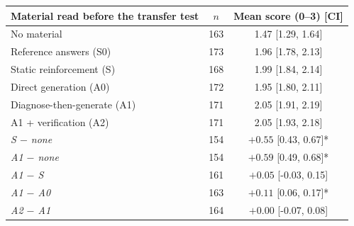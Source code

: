 \begin{tabular}{lcc}
\toprule
Material read before the transfer test & $n$ & Mean score (0--3) [CI] \\
\midrule
No material & 163 & 1.47 [1.29, 1.64] \\
Reference answers (S0) & 173 & 1.96 [1.78, 2.13] \\
Static reinforcement (S) & 168 & 1.99 [1.84, 2.14] \\
Direct generation (A0) & 172 & 1.95 [1.80, 2.11] \\
Diagnose-then-generate (A1) & 171 & 2.05 [1.91, 2.19] \\
A1 + verification (A2) & 171 & 2.05 [1.93, 2.18] \\
\midrule
\emph{S $-$ none} & 154 & $+0.55$ [0.43, 0.67]* \\
\emph{A1 $-$ none} & 154 & $+0.59$ [0.49, 0.68]* \\
\emph{A1 $-$ S} & 161 & $+0.05$ [-0.03, 0.15] \\
\emph{A1 $-$ A0} & 163 & $+0.11$ [0.06, 0.17]* \\
\emph{A2 $-$ A1} & 164 & $+0.00$ [-0.07, 0.08] \\
\bottomrule
\end{tabular}